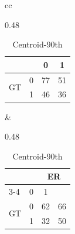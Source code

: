 \begin{table}[!b]
\begin{tabular}{cc}
\begin{subtable}{0.48\columnwidth}
\begin{tabular}{|lc|cc|}
        \multicolumn{2}{|l|}{} & \multicolumn{1}{c|}{0} & \multicolumn{1}{c|}{1} \\ \hline
        \multicolumn{1}{|c|}{\multirow{2}{*}{GT}} & 0 & \multicolumn{1}{c|}{77} & 51 \\ \cline{2-4}
        \multicolumn{1}{|c|}{} & 1 & \multicolumn{1}{c|}{46} & 36 \\ \hline
      \end{tabular}
      \vspace{5pt}
    \end{subtable}
    &
    \begin{subtable}{0.48\columnwidth}
      \centering
      \caption{Centroid-90th}
      \label{matrix_xg_train_d}
      \scriptsize
      \begin{tabular}{|lc|cc|}
        \hline
        \multicolumn{2}{|l|}{\multirow{2}{*}{}} & \multicolumn{2}{c|}{ER} \\ \cline{3-4}
        \multicolumn{2}{|l|}{} & \multicolumn{1}{c|}{0} & \multicolumn{1}{c|}{1} \\ \hline
        \multicolumn{1}{|c|}{\multirow{2}{*}{GT}} & 0 & \multicolumn{1}{c|}{62} & 66 \\ \cline{2-4}
        \multicolumn{1}{|c|}{} & 1 & \multicolumn{1}{c|}{32} & 50 \\ \hline
      \end{tabular}
      \vspace{5pt}
    \end{subtable}
    \\
  \end{tabular}
\end{table}

